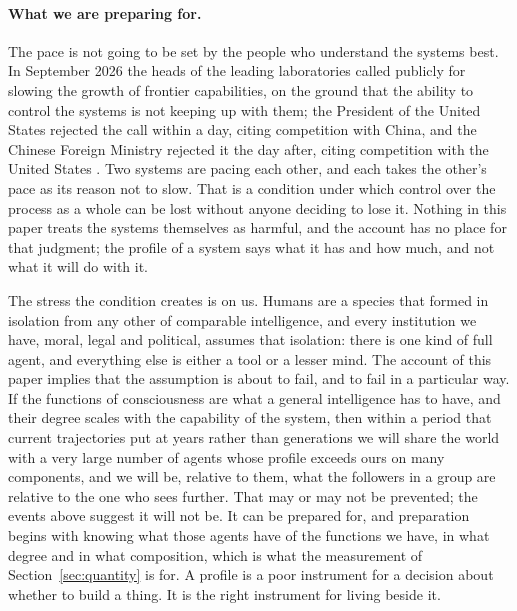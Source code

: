 \paragraph{What we are preparing for.}
The pace is not going to be set by the people who understand the systems best. In September 2026 the
heads of the leading laboratories called publicly for slowing the growth of frontier capabilities,
on the ground that the ability to control the systems is not keeping up with them; the President of
the United States rejected the call within a day, citing competition with China, and the Chinese
Foreign Ministry rejected it the day after, citing competition with the United States
\citep{amodei2026,wapo2026,nbc2026}. Two systems are pacing each other, and each takes the other's
pace as its reason not to slow. That is a condition under which control over the process as a whole
can be lost without anyone deciding to lose it. Nothing in this paper treats the systems themselves
as harmful, and the account has no place for that judgment; the profile of a system says what it has
and how much, and not what it will do with it.

The stress the condition creates is on us. Humans are a species that formed in isolation from any
other of comparable intelligence, and every institution we have, moral, legal and political, assumes
that isolation: there is one kind of full agent, and everything else is either a tool or a lesser
mind. The account of this paper implies that the assumption is about to fail, and to fail in a
particular way. If the functions of consciousness are what a general intelligence has to have, and
their degree scales with the capability of the system, then within a period that current trajectories
put at years rather than generations we will share the world with a very large number of agents whose
profile exceeds ours on many components, and we will be, relative to them, what the followers in a
group are relative to the one who sees further. That may or may not be prevented; the events above
suggest it will not be. It can be prepared for, and preparation begins with knowing what those agents
have of the functions we have, in what degree and in what composition, which is what the measurement
of Section~\ref{sec:quantity} is for. A profile is a poor instrument for a decision about whether to
build a thing. It is the right instrument for living beside it.


